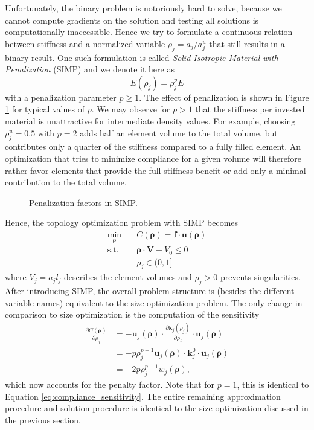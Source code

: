 Unfortunately, the binary problem is notoriously hard to solve, because we cannot compute gradients on the solution and testing all solutions is computationally inaccessible. Hence we try to formulate a continuous relation between stiffness and a normalized variable $\rho_j = a_j/a_j^u$ that still results in a binary result. One such formulation is called \emph{Solid Isotropic Material with Penalization} (SIMP) and we denote it here as 
\begin{equation}
    E(\rho_j)= \rho_j^p E
\end{equation}
with a penalization parameter $p \ge 1$. 
The effect of penalization is shown in Figure \ref{fig:simp_truss} for typical values of $p$. We may observe for $p>1$ that the stiffness per invested material is unattractive for intermediate density values. For example, choosing $\rho_j^u=0.5$ with $p=2$ adds half an element volume to the total volume, but contributes only a quarter of the stiffness compared to a fully filled element. An optimization that tries to minimize compliance for a given volume will therefore rather favor elements that provide the full stiffness benefit or add only a minimal contribution to the total volume.

\begin{figure}[!htpb]
    \centering
    
    \caption{Penalization factors in SIMP.}
    \label{fig:simp_truss}
\end{figure}

Hence, the topology optimization problem with SIMP becomes  
\begin{equation}
    \begin{aligned}
        \min_{\pmb{\rho}} \quad & C(\pmb{\rho}) = \mathbf{f} \cdot \mathbf{u}(\pmb{\rho})\\
        \textrm{s.t.} \quad & \pmb{\rho} \cdot \mathbf{V} - V_0 \le 0  \\
                            & \rho_j \in (0, 1]
    \end{aligned}
\end{equation}
where $V_j=a_j l_j$ describes the element volumes and $\rho_j >0$ prevents singularities. After introducing SIMP, the overall problem structure is (besides the different variable names) equivalent to the size optimization problem. The only change in comparison to size optimization  is the computation of the sensitivity
\begin{align}
    \frac{\partial C (\pmb{\rho})}{\partial \rho_j} 
    &= - \mathbf{u}_j (\pmb{\rho}) \cdot \frac{\partial \mathbf{k}_j(\rho_j)}{\partial \rho_j} \cdot \mathbf{u}_j (\pmb{\rho})  \\
    &= - p \rho_j^{p-1} \mathbf{u}_j (\pmb{\rho}) \cdot \mathbf{k}^0_j \cdot \mathbf{u}_j (\pmb{\rho})  \\
    &= - 2 p \rho_j^{p-1} w_j (\pmb{\rho}),
\end{align}
which now accounts for the penalty factor. Note that for $p=1$, this is identical to Equation \eqref{eq:compliance_sensitivity}. 
The entire remaining approximation procedure and solution procedure is identical to the size optimization discussed in the previous section.

